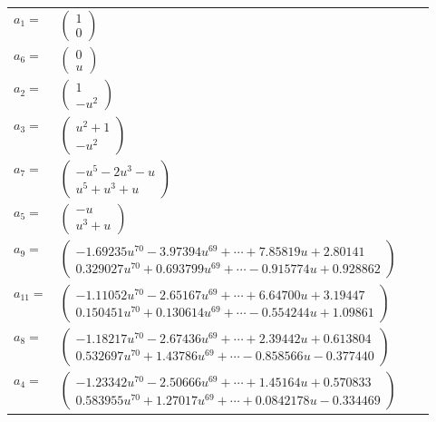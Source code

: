 \documentclass[1p]{elsarticle_modified}
\theoremstyle{definition}
\begin{document}
\begin{tabular}{m{7pt} m{180pt} m{7pt} m{180pt} }
\flushright $a_{1}=$&$\begin{pmatrix}1\\0\end{pmatrix}$ \\
\flushright $a_{6}=$&$\begin{pmatrix}0\\u\end{pmatrix}$ \\
\flushright $a_{2}=$&$\begin{pmatrix}1\\- u^2\end{pmatrix}$ \\
\flushright $a_{3}=$&$\begin{pmatrix}u^2+1\\- u^2\end{pmatrix}$ \\
\flushright $a_{7}=$&$\begin{pmatrix}- u^5-2 u^3- u\\u^5+u^3+u\end{pmatrix}$ \\
\flushright $a_{5}=$&$\begin{pmatrix}- u\\u^3+u\end{pmatrix}$ \\
\flushright $a_{9}=$&$\begin{pmatrix}-1.69235 u^{70}-3.97394 u^{69}+\cdots+7.85819 u+2.80141\\0.329027 u^{70}+0.693799 u^{69}+\cdots-0.915774 u+0.928862\end{pmatrix}$ \\
\flushright $a_{11}=$&$\begin{pmatrix}-1.11052 u^{70}-2.65167 u^{69}+\cdots+6.64700 u+3.19447\\0.150451 u^{70}+0.130614 u^{69}+\cdots-0.554244 u+1.09861\end{pmatrix}$ \\
\flushright $a_{8}=$&$\begin{pmatrix}-1.18217 u^{70}-2.67436 u^{69}+\cdots+2.39442 u+0.613804\\0.532697 u^{70}+1.43786 u^{69}+\cdots-0.858566 u-0.377440\end{pmatrix}$ \\
\flushright $a_{4}=$&$\begin{pmatrix}-1.23342 u^{70}-2.50666 u^{69}+\cdots+1.45164 u+0.570833\\0.583955 u^{70}+1.27017 u^{69}+\cdots+0.0842178 u-0.334469\end{pmatrix}$ \\

\end{tabular}
\end{document}
